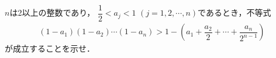 \documentclass[../../main.tex]{subfiles}
\begin{document}
$n$は2以上の整数であり，
$\displaystyle\dfrac{1}{2}<a_j<1$ $(j=1,2,\cdots,n)$であるとき，不等式
\begin{align*}
  (1-a_1)(1-a_2)\cdots(1-a_n)>1-\left(a_1+\dfrac{a_2}{2}+\cdots+\dfrac{a_n}{2^{n-1}}\right)
\end{align*}
が成立することを示せ．
\end{document}
